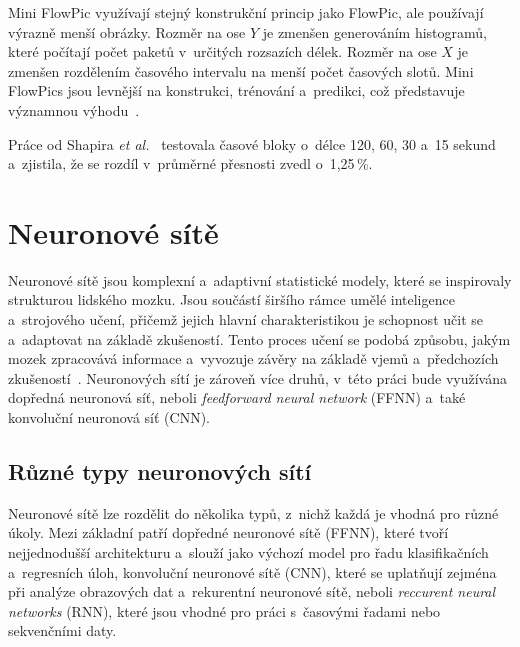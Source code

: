 Mini FlowPic využívají stejný konstrukční princip jako FlowPic, ale používají výrazně menší obrázky. Rozměr na ose $Y$ je zmenšen generováním histogramů, které počítají počet paketů v~určitých rozsazích délek. Rozměr na ose $X$ je zmenšen rozdělením časového intervalu na menší počet časových slotů. Mini FlowPics jsou levnější na konstrukci, trénování a~predikci, což představuje významnou výhodu~\cite{FlowPic_classification}.

Práce od Shapira \textit{et al.}~\cite{FlowPic} testovala časové bloky o~délce 120, 60, 30 a~15 sekund a~zjistila, že se rozdíl v~průměrné přesnosti zvedl o~1,25\,\%.


\chapter{Neuronové sítě}
Neuronové sítě jsou komplexní a~adaptivní statistické modely, které se inspirovaly strukturou lidského mozku. Jsou součástí širšího rámce umělé inteligence a~strojového učení, přičemž jejich hlavní charakteristikou je schopnost učit se a~adaptovat na základě zkušeností. Tento proces učení se podobá způsobu, jakým mozek zpracovává informace a~vyvozuje závěry na základě vjemů a~předchozích zkušeností~\cite{NNs}. Neuronových sítí je zároveň více druhů, v~této práci bude využívána dopředná neuronová síť, neboli \textit{feedforward neural network} (FFNN) a~také konvoluční neuronová síť (CNN).

\section{Různé typy neuronových sítí}
Neuronové sítě lze rozdělit do několika typů, z~nichž každá je vhodná pro různé úkoly. Mezi základní patří dopředné neuronové sítě (FFNN), které tvoří nejjednodušší architekturu a~slouží jako výchozí model pro řadu klasifikačních a~regresních úloh, konvoluční neuronové sítě (CNN), které se uplatňují zejména při analýze obrazových dat a~rekurentní neuronové sítě, neboli \textit{reccurent neural networks} (RNN), které jsou vhodné pro práci s~časovými řadami nebo sekvenčními daty.

